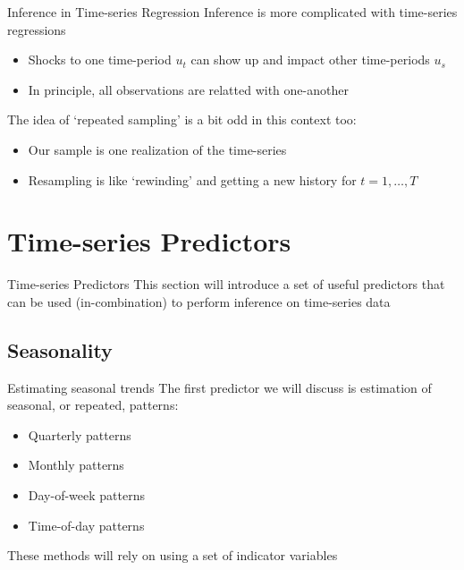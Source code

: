 \documentclass[aspectratio=169,t,11pt,table]{beamer}
\begin{document}
\begin{frame}{Inference in Time-series Regression}
  Inference is more complicated with time-series regressions
  
  \begin{itemize}
    \item Shocks to one time-period $u_t$ can show up and impact other time-periods $u_s$
    \item In principle, all observations are relatted with one-another
  \end{itemize}

  \pause
  \bigskip\medskip
  The idea of `repeated sampling' is a bit odd in this context too:
  \begin{itemize}
    \item Our sample is one realization of the time-series
    
    \item Resampling is like `rewinding' and getting a new history for $t = 1, \dots, T$
  \end{itemize}
\end{frame}

\section{Time-series Predictors}

\begin{frame}{Time-series Predictors}
  This section will introduce a set of useful predictors that can be used (in-combination) to perform inference on time-series data
\end{frame}

\subsection{Seasonality}

\begin{frame}{Estimating seasonal trends}
  The first predictor we will discuss is estimation of seasonal, or repeated, patterns:
  \begin{itemize}
    \item Quarterly patterns
    \item Monthly patterns
    \item Day-of-week patterns
    \item Time-of-day patterns
  \end{itemize}

  \bigskip
  These methods will rely on using a set of indicator variables
\end{frame}
\end{document}
